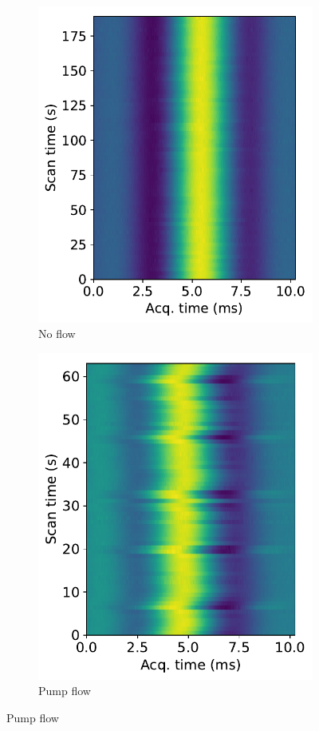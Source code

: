 \begin{figure}[ht]
\centering
\begin{subfigure}[t]{0.32\textwidth}
\caption{No flow}
\includegraphics[width=\textwidth]{figures/contflow/flowstabilitynoflow.pdf}
\end{subfigure}
\begin{subfigure}[t]{0.32\textwidth}
\caption{Pump flow}
\includegraphics[width=\textwidth]{figures/contflow/flowstabilitybadpump.pdf}

\end{subfigure}
\end{figure}
